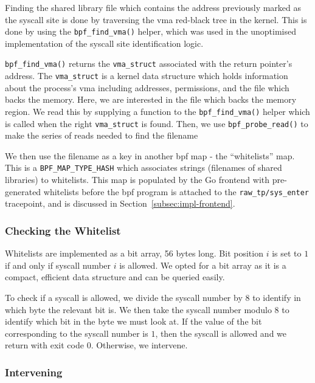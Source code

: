 Finding the shared library file which contains the address previously marked as
the syscall site is done by traversing the \ac{vma} red-black tree in the
kernel. This is done by using the \texttt{bpf\_find\_vma()} helper, which was used
in the unoptimised implementation of the syscall site identification logic.

\texttt{bpf\_find\_vma()} returns the \texttt{vma\_struct} associated with the
return pointer's address. The \texttt{vma\_struct} is a kernel data structure
which holds information about the process's \ac{vma} including addresses,
permissions, and the file which backs the memory. Here, we are interested in the
file which backs the memory region. We read this by supplying a function
to the \texttt{bpf\_find\_vma()} helper which is called when the right
\texttt{vma\_struct} is found. Then, we use \texttt{bpf\_probe\_read()} to make
the series of reads needed to find the filename


We then use the filename as a key in another \ac{bpf} map - the ``whitelists''
map. This is a \texttt{BPF\_MAP\_TYPE\_HASH} which associates strings (filenames
of shared libraries) to whitelists. This map is populated by the Go frontend
with pre-generated whitelists before the \ac{bpf} program is attached to the 
\texttt{raw\_tp/sys\_enter} tracepoint, and is discussed in 
Section~\ref{subsec:impl-frontend}.

\subsubsection{Checking the Whitelist}

Whitelists are implemented as a bit array, 56 bytes long. Bit position $i$ is
set to $1$ if and only if syscall number $i$ is allowed. We opted for a bit
array as it is a compact, efficient data structure and can be queried easily.

To check if a syscall is allowed, we divide the syscall number by 8 to identify in 
which byte the relevant bit is. We then take the syscall number modulo 8 to
identify which bit in the byte we must look at. If the value of the bit
corresponding to the syscall number is $1$, then the syscall is allowed and we
return with exit code 0. Otherwise, we intervene.

\subsubsection{Intervening}\label{subsubsec:impl-intervening}

